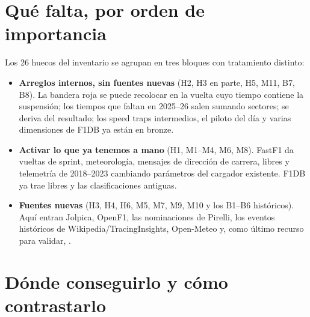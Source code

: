 \documentclass[11pt,openany]{report}
\begin{document}
\section*{Qué falta, por orden de importancia}

Los 26 huecos del inventario se agrupan en tres bloques con tratamiento distinto:

\begin{itemize}
  \item \textbf{Arreglos internos, sin fuentes nuevas} (H2, H3 en parte, H5, M11, B7, B8). La
  bandera roja se puede recolocar en la vuelta cuyo tiempo contiene la suspensión; los tiempos que
  faltan en 2025–26 salen sumando sectores;  se deriva del resultado; los speed
  traps intermedios, el piloto del día y varias dimensiones de F1DB ya están en bronze.
  \item \textbf{Activar lo que ya tenemos a mano} (H1, M1–M4, M6, M8). FastF1 da vueltas de sprint,
  meteorología, mensajes de dirección de carrera, libres y telemetría de 2018–2023 cambiando
  parámetros del cargador existente. F1DB ya trae libres y las clasificaciones antiguas.
  \item \textbf{Fuentes nuevas} (H3, H4, H6, M5, M7, M9, M10 y los B1–B6 históricos). Aquí entran
  Jolpica, OpenF1, las nominaciones de Pirelli, los eventos históricos de Wikipedia/TracingInsights,
  Open-Meteo y, como último recurso para validar, .
\end{itemize}

\section*{Dónde conseguirlo y cómo contrastarlo}
\end{document}
